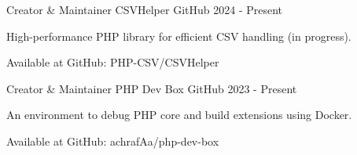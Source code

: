 \newpage


\begin{cventries}

\cventry
{Creator \& Maintainer} %
{CSVHelper} %
{GitHub} %
{2024 - Present} %
{
  \begin{cvitems} %
    \item {High-performance PHP library for efficient CSV handling (in progress).}
    \item {Available at GitHub: PHP-CSV/CSVHelper}
  \end{cvitems}
}

\cventry
{Creator \& Maintainer} %
{PHP Dev Box} %
{GitHub} %
{2023 - Present} %
{
  \begin{cvitems} %
    \item {An environment to debug PHP core and build extensions using Docker.}
    \item {Available at GitHub: achrafAa/php-dev-box}
  \end{cvitems}
}

\end{cventries} 